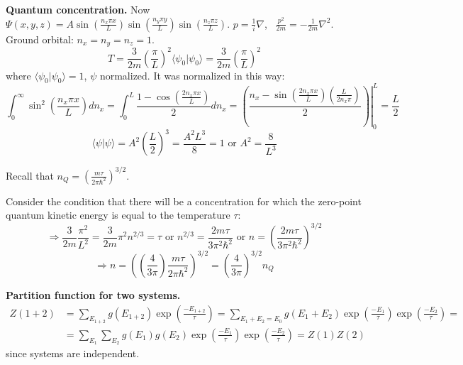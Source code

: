  \textbf{Quantum concentration.}  Now $\Psi(x,y,z) = A\sin{ \left( \frac{ n_x \pi x}{L} \right) }\sin{\left( \frac{n_y \pi y }{ L} \right) }\sin{ \left( \frac{n_z \pi z}{L} \right) }$.  $ p = \frac{1}{i} \nabla$, \quad \, $\frac{p^2}{2m} = -\frac{1}{2m} \nabla^2$.  \\
Ground orbital: $n_x = n_y = n_z = 1$.  
\[
T = \frac{3}{2m} \left( \frac{\pi}{L} \right)^2 \langle \psi_0 | \psi_0 \rangle = \frac{3}{2m } \left( \frac{\pi}{L}\right)^2 
\]
where $\langle \psi_0 | \psi_0 \rangle =1$, $\psi$ normalized.  It was normalized in this way:
\[
\int_0^{\infty} \sin^2{\left( \frac{ n_x \pi x}{L} \right) } dn_x = \int_0^L \frac{ 1 - \cos{ \left( \frac{ 2n_x \pi x}{L} \right) } }{2} dn_x = \left. \left( \frac{n_x - \sin{\left( \frac{ 2 n_x \pi x}{L} \right) } \left( \frac{L}{2n_x \pi } \right) }{ 2} \right) \right|_0^L = \frac{L}{2}
\]
\[
\langle \psi | \psi \rangle = A^2 \left( \frac{L}{2} \right)^3 = \frac{A^2 L^3}{8} = 1 \text{ or } A^2 = \frac{8}{L^3}
\]

Recall that $n_Q =  \left( \frac{m \tau}{ 2\pi \hbar^2 } \right)^{3/2}$.  

Consider the condition that there will be a concentration for which the zero-point quantum kinetic energy is equal to the temperature $\tau$:
\[
\Longrightarrow \frac{3}{2m} \frac{\pi^2 }{L^2 }  = \frac{3}{2m} \pi^2 n^{2/3} = \tau \text{ or } n^{2/3} = \frac{2m\tau}{3\pi^2 \hbar^2 } \text{ or } n = \left( \frac{2m \tau}{3 \pi^2 \hbar^2 } \right)^{3/2} 
\]
\[
\Longrightarrow \boxed{ n = ( \left( \frac{4}{3\pi} \right) \frac{m\tau}{ 2\pi \hbar^2 } )^{3/2} = \left( \frac{4}{3\pi }\right)^{3/2} n_Q }
\]


 \textbf{ Partition function for two systems.}
\[
\begin{aligned}
  Z(1+2) & = \sum_{E_{1+2} } g(E_{1+2} ) \exp{ \left( \frac{- E_{1+2}}{\tau} \right) } = \sum_{E_1 + E_2 = E_0 } g(E_1 + E_2) \exp{ \left( \frac{-E_1}{\tau} \right) } \exp{ \left( \frac{-E_2}{\tau} \right) }= \\
  & = \sum_{E_1} \sum_{E_2} g(E_1)g(E_2) \exp{\left( \frac{-E_1}{\tau} \right) } \exp{\left( \frac{-E_2}{\tau} \right) }  = Z(1)Z(2)
\end{aligned}
\]
since systems are independent.  










